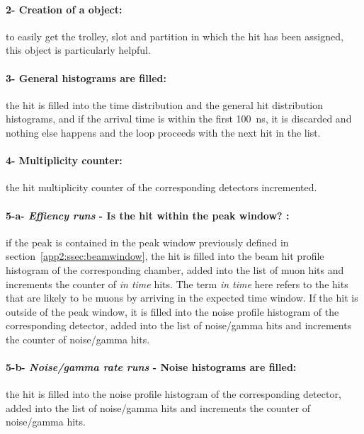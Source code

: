 	\paragraph{2- Creation of a  object:} to easily get the trolley, slot and partition in which the hit has been assigned, this object is particularly helpful.
	
	\paragraph{3- General histograms are filled:} the hit is filled into the time distribution and the general hit distribution histograms, and if the arrival time is within the first \SI{100}{ns}, it is discarded and nothing else happens and the loop proceeds with the next hit in the list.
	
	\paragraph{4- Multiplicity counter:}  the hit multiplicity counter of the corresponding detectors incremented.
	
	\paragraph{5-a- \textit{Effiency runs} - Is the hit within the peak window? :} if the peak is contained in the peak window previously defined in section~\ref{app2:ssec:beamwindow}, the hit is filled into the beam hit profile histogram of the corresponding chamber, added into the list of muon hits and increments the counter of \textit{in time} hits. The term \textit{in time} here refers to the hits that are likely to be muons by arriving in the expected time window. If the hit is outside of the peak window, it is filled into the noise profile histogram of the corresponding detector, added into the list of noise/gamma hits and increments the counter of noise/gamma hits.
	
	\paragraph{5-b- \textit{Noise/gamma rate runs} - Noise histograms are filled:} the hit is filled into the noise profile histogram of the corresponding detector, added into the list of noise/gamma hits and increments the counter of noise/gamma hits.\\
	
